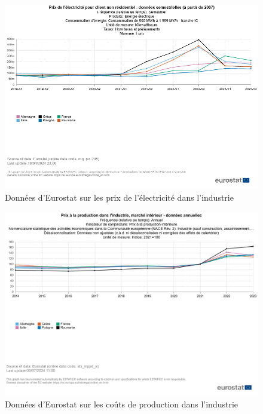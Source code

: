 \documentclass{article}
\begin{document}
\begin{figure}[H]
  \centering
  \begin{minipage}{0.8\textwidth}
      \centering
      \includegraphics[width=\textwidth]{"prix_elec.png"}
      \caption{Données d'Eurostat sur les prix de l'électricité dans l'industrie}
  \end{minipage}
\end{figure}

\begin{figure}[H]
  \centering
  \begin{minipage}{0.8\textwidth}
      \centering
      \includegraphics[width=\textwidth]{"prix_prod.png"}
      \caption{Données d'Eurostat sur les coûts de production dans l'industrie}
  \end{minipage}
\end{figure}
\end{document}
